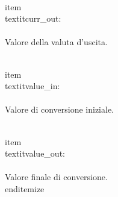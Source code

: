 \\item \\textit{curr_out}:
\\\\
Valore della valuta d'uscita.

\\item \\textit{value_in}:
\\\\
Valore di conversione iniziale.

\\item \\textit{value_out}:
\\\\
Valore finale di conversione.
\\end{itemize} 


\clearpage

